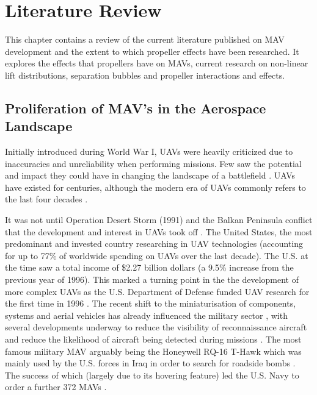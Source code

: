 \graphicspath{{./Figs/}}


\chapter{Literature Review}
This chapter contains a review of the current literature published on MAV development and the extent to which propeller effects have been researched. It explores the effects that propellers have on MAVs, current research on non-linear lift distributions, separation bubbles and propeller interactions and effects.

\section{Proliferation of MAV's in the Aerospace Landscape}
\label{subsec:ProliferationMAVs}
Initially introduced during World War I, UAVs were heavily criticized due to inaccuracies and unreliability when performing missions. Few saw the potential and impact they could have in changing the landscape of a battlefield \cite{thebook}. UAVs have existed for centuries, although the modern era of UAVs commonly refers to the last four decades \cite{Cook2007}. 

It was not until Operation Desert Storm (1991) and the Balkan Peninsula conflict that the development and interest in UAVs took off \cite{thebook} \cite{MacConnell2007}. The United States, the most predominant and invested country researching in UAV technologies (accounting for up to 77\% of worldwide spending on UAVs \cite{thebook} over the last decade). The U.S. at the time saw a total income of \$2.27 billion dollars \cite{thebook} (a 9.5\% increase from the previous year of 1996). This marked a turning point in the the development of more complex UAVs \cite{tac2022} as the U.S. Department of Defense funded UAV research for the first time in 1996 \cite{keennon2003}. The recent shift to the miniaturisation of components, systems and aerial vehicles has already influenced the military sector \cite{Aleksander2018} \cite{Mil2022}, with several developments underway to reduce the visibility of reconnaissance aircraft and reduce the likelihood of aircraft being detected during missions \cite{Greenwood2019} \cite{Saytov2022}.  The most famous military MAV arguably being the Honeywell RQ-16 T-Hawk \cite{Agbeyangi2016}  which was mainly used by the U.S. forces in Iraq in order to search for roadside bombs \cite{Crivoi2022}. The success of which (largely due to its hovering feature) led the U.S. Navy to order a further 372 MAVs \cite{design2022}.

